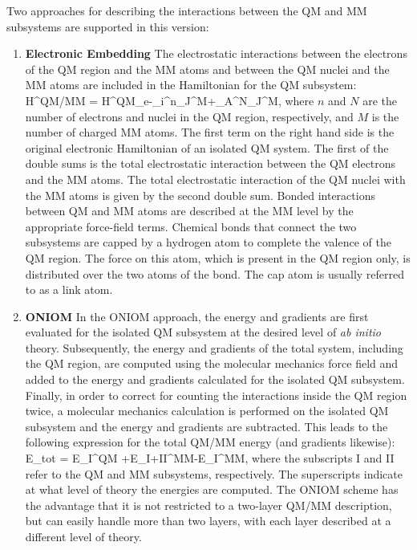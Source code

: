 Two approaches for describing the interactions between the QM and MM
subsystems are supported in this version:

\begin{enumerate}
\item{\textbf{Electronic Embedding}} The electrostatic interactions
between the electrons of the QM region and the MM atoms and between
the QM nuclei and the MM atoms are included in the Hamiltonian for
the QM subsystem: \beq H^{QM/MM} =
H^{QM}_e-\sum_i^n\sum_J^M+\sum_A^N\sum_J^M,
\eeq where $n$ and $N$ are the number of electrons and nuclei in the
QM region, respectively, and $M$ is the number of charged MM
atoms. The first term on the right hand side is the original
electronic Hamiltonian of an isolated QM system. The first of the
double sums is the total electrostatic interaction between the QM
electrons and the MM atoms. The total electrostatic interaction of the
QM nuclei with the MM atoms is given by the second double sum. Bonded
interactions between QM and MM atoms are described at the MM level by
the appropriate force-field terms. Chemical bonds that connect the two
subsystems are capped by a hydrogen atom to complete the valence of
the QM region. The force on this atom, which is present in the QM
region only, is distributed over the two atoms of the bond. The cap
atom is usually referred to as a link atom.

\item{\textbf{ONIOM}} In the ONIOM approach, the energy and gradients
are first evaluated for the isolated QM subsystem at the desired level
of {\it{ab initio}} theory. Subsequently, the energy and gradients of
the total system, including the QM region, are computed using the
molecular mechanics force field and added to the energy and gradients
calculated for the isolated QM subsystem. Finally, in order to correct
for counting the interactions inside the QM region twice, a molecular
mechanics calculation is performed on the isolated QM subsystem and
the energy and gradients are subtracted. This leads to the following
expression for the total QM/MM energy (and gradients likewise): \beq
E_{tot} = E_{I}^{QM}
+E_{I+II}^{MM}-E_{I}^{MM}, \eeq where the
subscripts I and II refer to the QM and MM subsystems,
respectively. The superscripts indicate at what level of theory the
energies are computed. The ONIOM scheme has the
advantage that it is not restricted to a two-layer QM/MM description,
but can easily handle more than two layers, with each layer described
at a different level of theory.
\end{enumerate}

